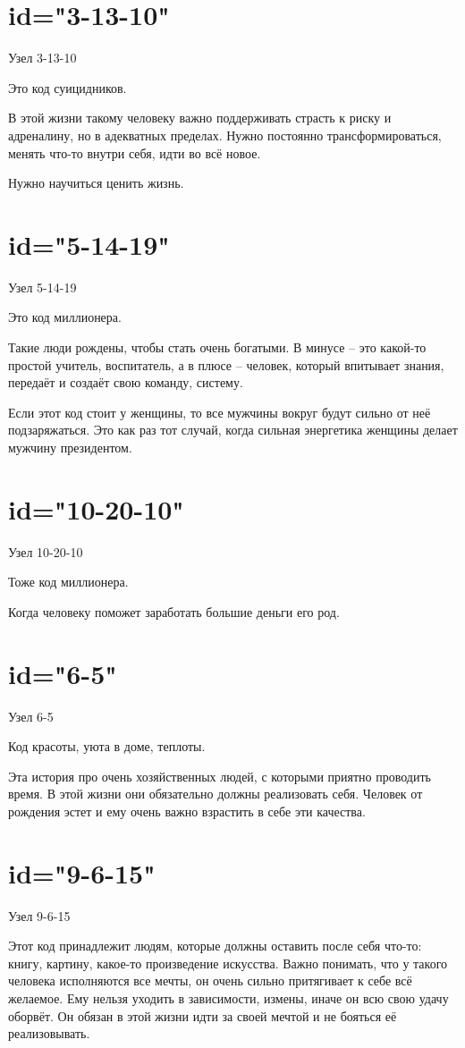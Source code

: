 \section{id="3-13-10"}{Узел 3-13-10}
\item Это код суицидников.
\item В этой жизни такому человеку важно поддерживать страсть к риску и адреналину, но в адекватных пределах. Нужно постоянно трансформироваться, менять что-то внутри себя, идти во всё новое.
\item Нужно научиться ценить жизнь.
\endsection

\section{id="5-14-19"}{Узел 5-14-19}
\item Это код миллионера.
\item Такие люди рождены, чтобы стать очень богатыми. В минусе – это какой-то простой учитель, воспитатель, а в плюсе – человек, который впитывает знания, передаёт и создаёт свою команду, систему.
\item Если этот код стоит у женщины, то все мужчины вокруг будут сильно от неё подзаряжаться. Это как раз тот случай, когда сильная энергетика женщины делает мужчину президентом.
\endsection

\section{id="10-20-10"}{Узел 10-20-10}
\item Тоже код миллионера.
\item Когда человеку поможет заработать большие деньги его род.
\endsection

\section{id="6-5"}{Узел 6-5}
\item Код красоты, уюта в доме, теплоты.
\item Эта история про очень хозяйственных людей, с которыми приятно проводить время. В этой жизни они обязательно должны реализовать себя. Человек от рождения эстет и ему очень важно взрастить в себе эти качества.
\endsection

\section{id="9-6-15"}{Узел 9-6-15}
\item Этот код принадлежит людям, которые должны оставить после себя что-то: книгу, картину, какое-то произведение искусства. Важно понимать, что у такого человека исполняются все мечты, он очень сильно притягивает к себе всё желаемое. Ему нельзя уходить в зависимости, измены, иначе он всю свою удачу оборвёт. Он обязан в этой жизни идти за своей мечтой и не бояться её реализовывать.
\endsection

